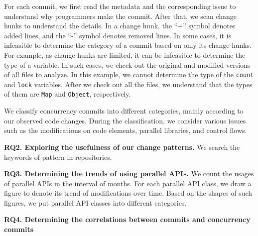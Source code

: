 For each commit, we first read the metadata and the corresponding issue to understand why programmers make the commit. After that, we scan change hunks to understand the details. In a change hunk, the ``+'' symbol denotes added lines, and the ``-'' symbol denotes removed lines. In some cases, it is infeasible to determine the category of a commit based on only its change hunks. For example, as change hunks are limited, it can be infeasible to determine the type of a variable. In such cases, we check out the original and modified versions of all files to analyze. In this example, we cannot determine the type of the \texttt{count} and \texttt{lock} variables. After we check out all the files, we understand that the types of them are \texttt{Map} and \texttt{Object}, respectively.


We classify concurrency commits into different categories, mainly according to our observed code changes. During the classification, we consider various issues such as the modifications on code elements, parallel libraries, and control flows.

\textbf{RQ2. Exploring the usefulness of our change patterns.} We search the keywords of pattern in repositories. 


\textbf{RQ3. Determining the trends of using parallel APIs.} We count the usages of parallel APIs in the interval of months.  For each parallel API class, we draw a figure to denote its trend of modifications over time. Based on the shapes of such figures, we put parallel API classes into different categories.

\textbf{RQ4. Determining the correlations between commits and concurrency commits} 





